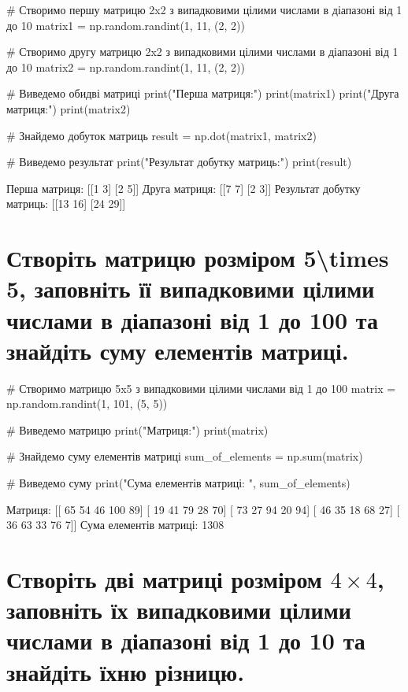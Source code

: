 \documentclass[]{article}
\newcounter{pythoncode}
\begin{document}
\begin{pythoncode}
    # Створимо першу матрицю 2x2 з випадковими цілими числами в діапазоні від 1 до 10
    matrix1 = np.random.randint(1, 11, (2, 2))

    # Створимо другу матрицю 2x2 з випадковими цілими числами в діапазоні від 1 до 10
    matrix2 = np.random.randint(1, 11, (2, 2))

    # Виведемо обидві матриці
    print("Перша матриця:")
    print(matrix1)
    print("Друга матриця:")
    print(matrix2)

    # Знайдемо добуток матриць
    result = np.dot(matrix1, matrix2)

    # Виведемо результат
    print("Результат добутку матриць:")
    print(result)
\end{pythoncode}

\begin{out}
	Перша матриця:
	[[1 3]
	 [2 5]]
	Друга матриця:
	[[7 7]
	 [2 3]]
	Результат добутку матриць:
	[[13 16]
	 [24 29]]
\end{out}

\section{Створіть матрицю розміром 5\textbackslash times 5, заповніть її випадковими цілими числами в діапазоні від 1 до 100 та знайдіть суму елементів матриці.}

\begin{pythoncode}
    # Створимо матрицю 5x5 з випадковими цілими числами від 1 до 100
    matrix = np.random.randint(1, 101, (5, 5))

    # Виведемо матрицю
    print("Матриця:")
    print(matrix)

    # Знайдемо суму елементів матриці
    sum_of_elements = np.sum(matrix)

    # Виведемо суму
    print("Сума елементів матриці: ", sum_of_elements)
\end{pythoncode}

\begin{out}
	Матриця:
	[[ 65  54  46 100  89]
	 [ 19  41  79  28  70]
	 [ 73  27  94  20  94]
	 [ 46  35  18  68  27]
	 [ 36  63  33  76   7]]
	Сума елементів матриці:  1308
\end{out}

\section{\texorpdfstring{Створіть дві матриці розміром
		\(4\times 4\), заповніть їх випадковими цілими числами в діапазоні від 1
		до 10 та знайдіть їхню
		різницю.}{Створіть дві матриці розміром 4\textbackslash times 4, заповніть їх випадковими цілими числами в діапазоні від 1 до 10 та знайдіть їхню різницю.}}
\end{document}
